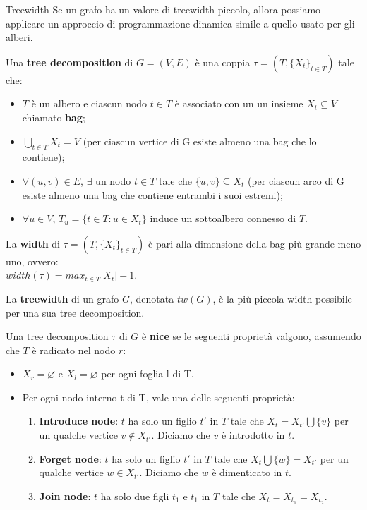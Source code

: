 \documentclass[10pt,a4paper]{article}
\begin{document}
\begin{multicols}{3}
\begin{textbox}{Treewidth}
Se un grafo ha un valore di treewidth
piccolo, allora possiamo applicare un approccio di
programmazione dinamica simile a quello usato per gli alberi.

Una \textbf{tree decomposition} di \(G=(V,E)\) è una coppia \(\tau=(T, \{X_t\}_{t\in T})\) tale che:
\begin{itemize}[leftmargin=*]
    \item \(T\) è un albero e ciascun nodo \(t\in T\) è associato con un un insieme \(X_t \subseteq V\) chiamato \textbf{bag};
    \item \(\bigcup_{t\in T}X_t=V\) (per ciascun vertice di G esiste almeno una bag che lo contiene);
    \item \(\forall (u,v) \in E\), \(\exists\) un nodo \(t\in T\) tale che \(\{u,v\} \subseteq X_t\)
    (per ciascun arco di G esiste almeno una bag che contiene entrambi i suoi estremi);
    \item \(\forall u \in V\), \(T_u = \{t\in T: u\in X_t\}\) induce un sottoalbero connesso di \(T\).
\end{itemize}

La \textbf{width} di \(\tau=(T, \{X_t\}_{t\in T})\) è pari alla dimensione della bag più
grande meno uno, ovvero:\\\(width(\tau) = max_{t\in T} |X_t|-1\).

La \textbf{treewidth} di un grafo \(G\), denotata \(tw(G)\), è la più piccola width
possibile per una sua tree decomposition.

Una tree decomposition \(\tau\) di \(G\) è \textbf{nice} se le seguenti
proprietà valgono, assumendo che \(T\) è radicato nel nodo \(r\):
\begin{itemize}[leftmargin=*]
    \item \(X_r=\varnothing\) e \(X_l=\varnothing\) per ogni foglia l di T.
    \item Per ogni nodo interno t di T, vale una delle seguenti proprietà:
    \begin{enumerate}[leftmargin=*]
        \item \textbf{Introduce node}: \(t\) ha solo un figlio \(t'\) in \(T\) tale che
        \(X_t = X_{t'}\bigcup \{v\}\) per un qualche vertice \(v \notin X_{t'}\).
        Diciamo che \(v\) è introdotto in \(t\).
        \item \textbf{Forget node}: \(t\) ha solo un figlio \(t'\) in \(T\) tale che
        \(X_t\bigcup \{w\} = X_{t'}\) per un qualche vertice \(w \in X_{t'}\).
        Diciamo che \(w\) è dimenticato in \(t\).
        \item \textbf{Join node}: \(t\) ha solo due figli \(t_1\) e \(t_1\) in \(T\) tale che
        \(X_t = X_{t_1}= X_{t_2}\).
    \end{enumerate}
\end{itemize}


\end{textbox}
\end{multicols}
\end{document}
